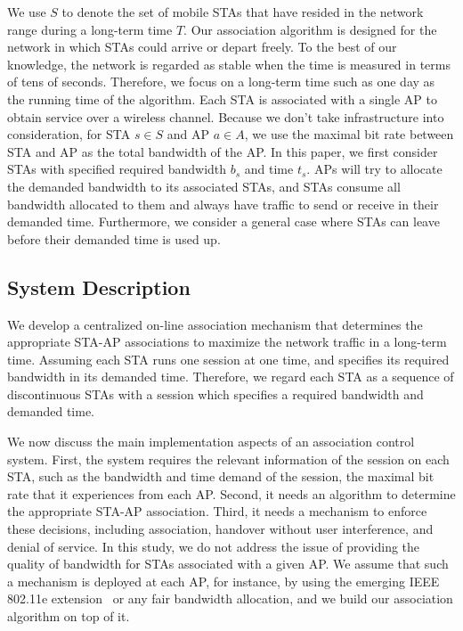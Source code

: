 \documentclass[conference]{IEEEtran}
\begin{document}
  We use $S$ to denote the set of mobile STAs that have resided in the network range during a long-term time $T$.  Our association algorithm is designed for the network in which STAs could arrive or depart freely. To the best of our knowledge, the network is regarded as stable when the time is measured in terms of tens of seconds.  Therefore, we focus on a long-term time such as one day as the running time of the algorithm.  Each STA is associated with a single AP to obtain service over a wireless channel.  Because we don't take infrastructure into consideration, for STA $s\in S$ and AP $a\in A$, we use the maximal bit rate between STA and AP as the total bandwidth of the AP. In this paper, we first consider STAs with specified required bandwidth $b_s$ and  time $t_s$.  APs will try to allocate the demanded bandwidth to its associated STAs, and STAs consume all bandwidth allocated to them and always have traffic to send or receive in their demanded time.  Furthermore, we consider a general case where STAs can leave before their demanded time is used up.

  \subsection{System Description}
  We develop a centralized on-line association mechanism that determines the appropriate STA-AP associations to maximize the network traffic in a long-term time.  Assuming each STA runs one session at one time, and specifies its required bandwidth in its demanded time.  Therefore, we regard each STA as a sequence of discontinuous STAs with a session which specifies a required bandwidth and demanded time.


  We now discuss the main implementation aspects of an association control system. First, the system requires the relevant information of the session on each STA, such as the bandwidth and time demand of the session, the maximal bit rate that it experiences from each AP.  Second, it needs an algorithm to determine the appropriate STA-AP association.  Third, it needs a mechanism to enforce these decisions, including association, handover without user interference, and denial of service.  In this study, we do not address the issue of providing the quality of bandwidth for STAs associated with a given AP.  We assume that such a mechanism is deployed at each AP, for instance, by using the emerging IEEE 802.11e extension~\cite{Ni:2004} or any fair bandwidth allocation, and we build our association algorithm on top of it.
\end{document}
